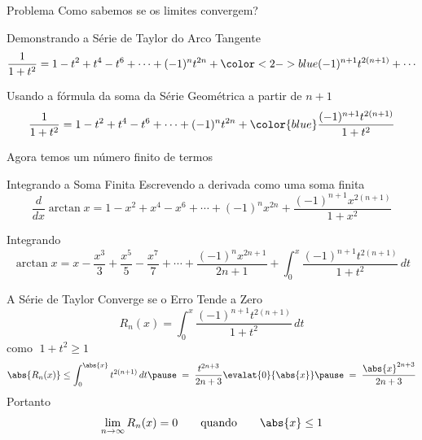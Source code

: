 \begin{frame}{Problema}
  Como sabemos se os limites convergem?
\end{frame}

\begin{frame}{Demonstrando a Série de Taylor do Arco Tangente}
  \[
    \frac{1}{1+t^2} = 1 - t^2 + t^4 - t^6 + \cdots
                    + (-1)^n t^{2n}
                    + {\color<2->{blue}(-1)^{n+1} t^{2(n+1)} + \cdots}
  \]

  \pause
  \vspace{0.5\baselineskip}
  Usando a fórmula da soma da Série Geométrica a partir de $n+1$
  \[
    \frac{1}{1+t^2} = 1 - t^2 + t^4 - t^6 + \cdots
                    + (-1)^n t^{2n}
                    + {\color{blue}\frac{(-1)^{n+1} t^{2(n+1)}}{1+t^2}}
  \]

  \pause
  \vspace{0.5\baselineskip}
  Agora temos um número finito de termos
\end{frame}

\begin{frame}{Integrando a Soma Finita}
  Escrevendo a derivada como uma soma finita
  \[
    \frac{d}{dx} \arctan x = 1 - x^2 + x^4 - x^6
                           + \cdots
                           + (-1)^n x^{2n}
                           + \frac{(-1)^{n+1} x^{2(n+1)}}{1+x^2}
  \]

  \pause
  \vspace{0.5\baselineskip}
  Integrando
  \[
    \arctan x = x - \frac{x^3}{3}
                  + \frac{x^5}{5}
                  - \frac{x^7}{7}
                  + \cdots
                  + \frac{(-1)^n x^{2n+1}}{2n+1}
                  + \int_0^x \frac{(-1)^{n+1} t^{2(n+1)}}{1+t^2} \,dt
  \]
\end{frame}

\begin{frame}{A Série de Taylor Converge se o Erro Tende a Zero}
  \[
    R_n(x) = \int_0^x \frac{(-1)^{n+1} t^{2(n+1)}}{1+t^2} \,dt
  \]
  \pause
  como \(\;1+t^2\geq 1\;\)
  \[
    \abs{R_n(x)} \leq \int_0^{\abs{x}} t^{2(n+1)} \,dt \pause
      \; = \; \frac{t^{2n+3}}{2n+3}\evalat{0}{\abs{x}} \pause
      \; = \; \frac{\abs{x}^{2n+3}}{2n+3}
  \]
  \pause
  Portanto
  \[
    \lim_{n\to\infty} R_n(x) = 0 \qquad\text{quando}\qquad \abs{x} \leq 1
  \]
\end{frame}


